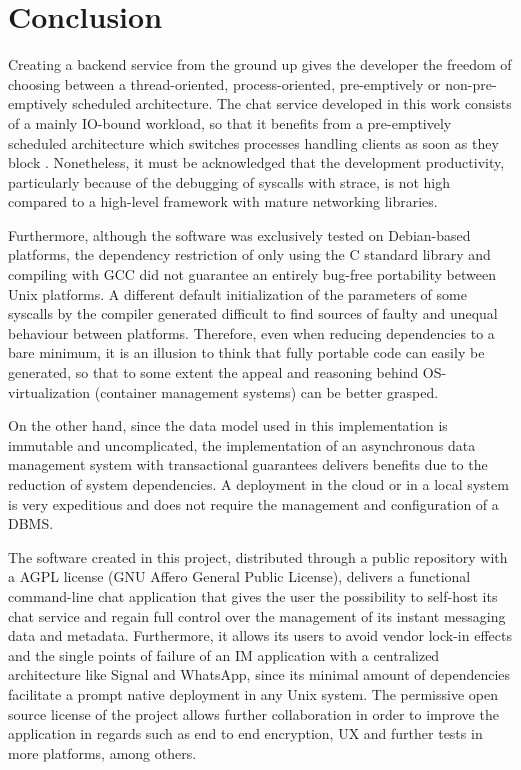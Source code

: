 \section{Conclusion}
Creating a backend service from the ground up gives the developer the freedom of choosing between a thread-oriented, process-oriented, pre-emptively or non-pre-emptively scheduled architecture. The chat service developed in this work consists of a mainly IO-bound workload, so that it benefits from a pre-emptively scheduled architecture which switches processes handling clients as soon as they block \cite{Kennedy2018}. Nonetheless, it must be acknowledged that the development productivity, particularly because of the debugging of syscalls with strace, is not high compared to a high-level framework with mature networking libraries.

Furthermore, although the software was exclusively tested on Debian-based platforms, the dependency restriction of only using the C standard library and compiling with GCC did not guarantee an entirely bug-free portability between Unix platforms. A different default initialization of the parameters of some syscalls by the compiler generated difficult to find sources of faulty and unequal behaviour between platforms. Therefore, even when reducing dependencies to a bare minimum, it is an illusion to think that fully portable code can easily be generated, so that to some extent the appeal and reasoning behind OS-virtualization (container management systems) can be better grasped.

On the other hand, since the data model used in this implementation is immutable and uncomplicated, the implementation of an asynchronous data management system with transactional guarantees delivers benefits due to the reduction of system dependencies. A deployment in the cloud or in a local system is very expeditious and does not require the management and configuration of a DBMS.

The software created in this project, distributed through a public repository with a AGPL license (GNU Affero General Public License), delivers a functional command-line chat application that gives the user the possibility to self-host its chat service and regain full control over the management of its instant messaging data and metadata. Furthermore, it allows its users to avoid vendor lock-in effects and the single points of failure of an IM application with a centralized architecture like Signal and WhatsApp, since its minimal amount of dependencies facilitate a prompt native deployment in any Unix system. The permissive open source license of the project allows further collaboration in order to improve the application in regards such as end to end encryption, UX and further tests in more platforms, among others.